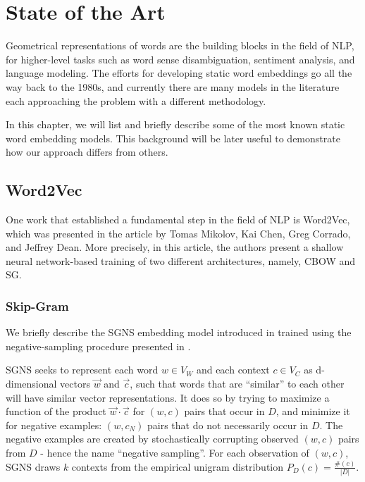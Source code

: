 \chapter{State of the Art}
\label{chp:stateOfArt}

Geometrical representations of words are the building blocks in the field of \ac{NLP}, for higher-level tasks such as word sense disambiguation, sentiment analysis, and language modeling. The efforts for developing static word embeddings go all the way back to the 1980s, and currently there are many models in the literature each approaching the problem with a different methodology.

In this chapter, we will list and briefly describe some of the most known static word embedding models. This background will be later useful to demonstrate how our approach differs from others.

\section{Word2Vec}

One work that established a fundamental step in the field of \ac{NLP} is Word2Vec, which was presented in the article \cite{w2v} by Tomas Mikolov, Kai Chen, Greg Corrado, and Jeffrey Dean. More precisely, in this article, the authors present a shallow neural network-based training of two different architectures, namely, \ac{CBOW} and \ac{SG}.

\subsection{Skip-Gram}

We briefly describe the \ac{SGNS} embedding model introduced in \cite{w2v} trained using the negative-sampling procedure presented in \cite{w2v2}. 

\ac{SGNS} seeks to represent each word $w \in V_W$ and each context $c \in V_C$ as d-dimensional vectors $\overrightarrow{w}$ and $\overrightarrow{c}$, such that words that are “similar” to each other will have similar vector representations. It does so by trying to maximize a function of the product $\overrightarrow{w} \cdot \overrightarrow{c}$ for $(w, c)$ pairs that occur in $D$, and minimize it for negative examples: $(w, c_N)$ pairs that do not necessarily occur in $D$. The negative examples are created by stochastically corrupting observed $(w, c)$ pairs from $D$ - hence the name “negative sampling”. For each observation of $(w, c)$, SGNS draws $k$ contexts from the empirical unigram distribution $P_D(c) = \frac{\#(c)}{|D|}$. 



